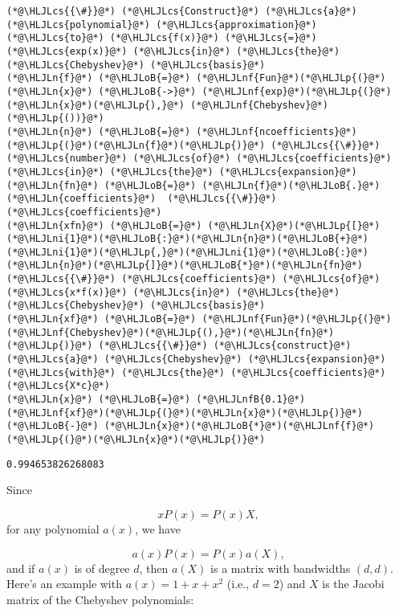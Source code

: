 \documentclass[12pt,a4paper]{article}
\newcommand{\HLJLn}[1]{#1}
\newcommand{\HLJLnf}[1]{\textcolor[RGB]{66,102,213}{#1}}
\newcommand{\HLJLnfB}[1]{\textcolor[RGB]{59,151,46}{#1}}
\newcommand{\HLJLni}[1]{\textcolor[RGB]{59,151,46}{#1}}
\newcommand{\HLJLoB}[1]{\textcolor[RGB]{102,102,102}{\textbf{#1}}}
\newcommand{\HLJLp}[1]{#1}
\newcommand{\HLJLcs}[1]{\textcolor[RGB]{153,153,119}{\textit{#1}}}
\begin{document}
\begin{lstlisting}
(*@\HLJLcs{{\#}}@*) (*@\HLJLcs{Construct}@*) (*@\HLJLcs{a}@*) (*@\HLJLcs{polynomial}@*) (*@\HLJLcs{approximation}@*) (*@\HLJLcs{to}@*) (*@\HLJLcs{f(x)}@*) (*@\HLJLcs{=}@*) (*@\HLJLcs{exp(x)}@*) (*@\HLJLcs{in}@*) (*@\HLJLcs{the}@*) (*@\HLJLcs{Chebyshev}@*) (*@\HLJLcs{basis}@*)
(*@\HLJLn{f}@*) (*@\HLJLoB{=}@*) (*@\HLJLnf{Fun}@*)(*@\HLJLp{(}@*)(*@\HLJLn{x}@*) (*@\HLJLoB{->}@*) (*@\HLJLnf{exp}@*)(*@\HLJLp{(}@*)(*@\HLJLn{x}@*)(*@\HLJLp{),}@*) (*@\HLJLnf{Chebyshev}@*)(*@\HLJLp{())}@*)
(*@\HLJLn{n}@*) (*@\HLJLoB{=}@*) (*@\HLJLnf{ncoefficients}@*)(*@\HLJLp{(}@*)(*@\HLJLn{f}@*)(*@\HLJLp{)}@*) (*@\HLJLcs{{\#}}@*) (*@\HLJLcs{number}@*) (*@\HLJLcs{of}@*) (*@\HLJLcs{coefficients}@*) (*@\HLJLcs{in}@*) (*@\HLJLcs{the}@*) (*@\HLJLcs{expansion}@*)
(*@\HLJLn{fn}@*) (*@\HLJLoB{=}@*) (*@\HLJLn{f}@*)(*@\HLJLoB{.}@*)(*@\HLJLn{coefficients}@*)  (*@\HLJLcs{{\#}}@*) (*@\HLJLcs{coefficients}@*)
(*@\HLJLn{xfn}@*) (*@\HLJLoB{=}@*) (*@\HLJLn{X}@*)(*@\HLJLp{[}@*)(*@\HLJLni{1}@*)(*@\HLJLoB{:}@*)(*@\HLJLn{n}@*)(*@\HLJLoB{+}@*)(*@\HLJLni{1}@*)(*@\HLJLp{,}@*)(*@\HLJLni{1}@*)(*@\HLJLoB{:}@*)(*@\HLJLn{n}@*)(*@\HLJLp{]}@*)(*@\HLJLoB{*}@*)(*@\HLJLn{fn}@*)  (*@\HLJLcs{{\#}}@*) (*@\HLJLcs{coefficients}@*) (*@\HLJLcs{of}@*) (*@\HLJLcs{x*f(x)}@*) (*@\HLJLcs{in}@*) (*@\HLJLcs{the}@*) (*@\HLJLcs{Chebyshev}@*) (*@\HLJLcs{basis}@*)
(*@\HLJLn{xf}@*) (*@\HLJLoB{=}@*) (*@\HLJLnf{Fun}@*)(*@\HLJLp{(}@*)(*@\HLJLnf{Chebyshev}@*)(*@\HLJLp{(),}@*)(*@\HLJLn{fn}@*)(*@\HLJLp{)}@*) (*@\HLJLcs{{\#}}@*) (*@\HLJLcs{construct}@*) (*@\HLJLcs{a}@*) (*@\HLJLcs{Chebyshev}@*) (*@\HLJLcs{expansion}@*) (*@\HLJLcs{with}@*) (*@\HLJLcs{the}@*) (*@\HLJLcs{coefficients}@*) (*@\HLJLcs{X*c}@*)
(*@\HLJLn{x}@*) (*@\HLJLoB{=}@*) (*@\HLJLnfB{0.1}@*)
(*@\HLJLnf{xf}@*)(*@\HLJLp{(}@*)(*@\HLJLn{x}@*)(*@\HLJLp{)}@*) (*@\HLJLoB{-}@*) (*@\HLJLn{x}@*)(*@\HLJLoB{*}@*)(*@\HLJLnf{f}@*)(*@\HLJLp{(}@*)(*@\HLJLn{x}@*)(*@\HLJLp{)}@*)
\end{lstlisting}

\begin{lstlisting}
0.994653826268083
\end{lstlisting}


Since 

\[
xP(x) = P(x) X,
\]
for any polynomial $a(x)$, we have

\[
a(x) P(x) = P(x) a(X),
\]
and if $a(x)$ is of degree $d$, then $a(X)$ is a matrix with bandwidths $(d,d)$.  Here's an example with $a(x) = 1 + x + x^2$ (i.e., $d = 2$) and $X$ is the Jacobi matrix of the Chebyshev polynomials:
\end{document}
